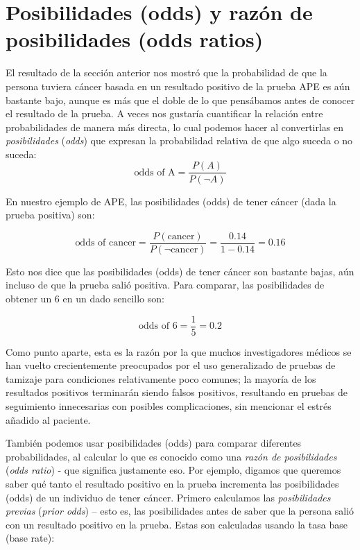\documentclass[
  12pt,
]{book}
\begin{document}
\hypertarget{posibilidades-odds-y-razuxf3n-de-posibilidades-odds-ratios}{%
\section{Posibilidades (odds) y razón de posibilidades (odds ratios)}\label{posibilidades-odds-y-razuxf3n-de-posibilidades-odds-ratios}}

El resultado de la sección anterior nos mostró que la probabilidad de que la persona tuviera cáncer basada en un resultado positivo de la prueba APE es aún bastante bajo, aunque es más que el doble de lo que pensábamos antes de conocer el resultado de la prueba. A veces nos gustaría cuantificar la relación entre probabilidades de manera más directa, lo cual podemos hacer al convertirlas en \emph{posibilidades} (\emph{odds}) que expresan la probabilidad relativa de que algo suceda o no suceda:
\[
\text{odds of A} = \frac{P(A)}{P(\neg A)}
\]

En nuestro ejemplo de APE, las posibilidades (odds) de tener cáncer (dada la prueba positiva) son:

\[
\text{odds of cancer} = \frac{P(\text{cancer})}{P(\neg \text{cancer})} =\frac{0.14}{1 - 0.14} = 0.16
\]

Esto nos dice que las posibilidades (odds) de tener cáncer son bastante bajas, aún incluso de que la prueba salió positiva. Para comparar, las posibilidades de obtener un 6 en un dado sencillo son:

\[
\text{odds of 6} = \frac{1}{5} = 0.2
\]

Como punto aparte, esta es la razón por la que muchos investigadores médicos se han vuelto crecientemente preocupados por el uso generalizado de pruebas de tamizaje para condiciones relativamente poco comunes; la mayoría de los resultados positivos terminarán siendo falsos positivos, resultando en pruebas de seguimiento innecesarias con posibles complicaciones, sin mencionar el estrés añadido al paciente.

También podemos usar posibilidades (odds) para comparar diferentes probabilidades, al calcular lo que es conocido como una \emph{razón de posibilidades} (\emph{odds ratio}) - que significa justamente eso. Por ejemplo, digamos que queremos saber qué tanto el resultado positivo en la prueba incrementa las posibilidades (odds) de un individuo de tener cáncer. Primero calculamos las \emph{posibilidades previas} (\emph{prior odds}) -- esto es, las posibilidades antes de saber que la persona salió con un resultado positivo en la prueba. Estas son calculadas usando la tasa base (base rate):
\end{document}
